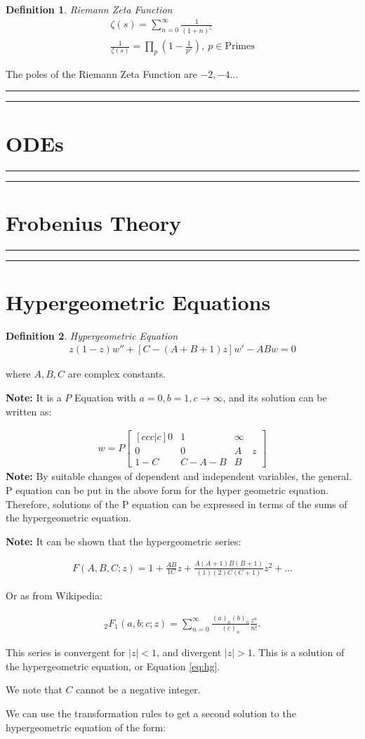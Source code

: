 \documentclass{article}
\theoremstyle{definition}
\newtheorem{definition}{Definition}[section]
\newcommand{\Section}[1]{\hrule\hrule\section{#1}}
\newcommand{\Def}[2]{
\begin{shaded*}
\begin{definition}{\textit{#1}}\\#2\end{definition}
\end{shaded*}
}
\begin{document}
\Def{Riemann Zeta Function}{
\begin{align*}
\zeta(s) = \sum_{n=0}^{\infty} \frac{1}{(1+n)^\zeta} \\ 
\frac{1}{\zeta(s)} = \prod_{p} (1-\frac{1}{p^s}),\ p \in \text{Primes}
\end{align*}

The poles of the Riemann Zeta Function are $-2, -4...$ 
}

\Section{ODEs}

\Section{Frobenius Theory}
\Section{Hypergeometric Equations}
\Def{Hypergeometric Equation}{
\begin{align}\label{eq:hg}
z(1-z)w''+[C-(A+B+1)z]w'-ABw=0
\end{align}

where $A,B,C$ are complex constants. 
}

\textbf{Note:} It is a $P$ Equation with $a=0, b=1, c\to \infty$, and its solution can be written as:

\begin{align*}
w = P\begin{bmatrix}[ccc|c]
0 & 1 & \infty& \\ 
0 & 0 & A & z\\ 
1-C & C-A-B & B &
\end{bmatrix} 
\end{align*}
\textbf{Note:} By suitable changes of dependent and independent variables, the general. P equation can be put in the above form for the hyper geometric equation. Therefore, solutions of the P equation can be expressed in terms of the sums of the hypergeometric equation.

\textbf{Note:} It can be shown that the hypergeometric series:

\begin{align*}
F(A,B,C;z) = 1+\frac{AB}{1C}z + \frac{A(A+1)B(B+1)}{(1)(2)C(C+1)}z^2+...
\end{align*}

Or as from Wikipedia:

\begin{align*}
{}_{2}F_{1}(a,b;c;z)=\sum _{n=0}^{\infty }{\frac {(a)_{n}(b)_{n}}{(c)_{n}}}{\frac {z^{n}}{n!}}.
\end{align*}

This series is convergent for $|z|<1$, and divergent $|z|>1$. This is a solution of the hypergeometric equation, or Equation \ref{eq:hg}.

We note that $C$ cannot be a negative integer.

We can use the transformation rules to get a second solution to the hypergeometric equation of the form:
\end{document}

